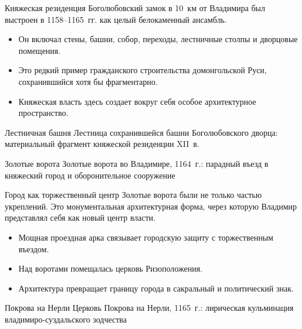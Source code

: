 \begin{frame}{Княжеская резиденция}
  Боголюбовский замок в 10~км от Владимира был выстроен
  в 1158--1165~гг. как целый белокаменный ансамбль.

  \begin{itemize}
    \item Он включал стены, башни, собор, переходы,
          лестничные столпы и дворцовые помещения.
    \item Это редкий пример гражданского строительства
          домонгольской Руси, сохранившийся хотя бы фрагментарно.
    \item Княжеская власть здесь создает вокруг себя
          особое архитектурное пространство.
  \end{itemize}
\end{frame}

\begin{frame}{Лестничная башня}
    {Лестница сохранившейся башни Боголюбовского дворца:
     материальный фрагмент княжеской резиденции XII~в.}
\end{frame}

\begin{frame}{Золотые ворота}
    {Золотые ворота во Владимире, 1164~г.:
     парадный въезд в княжеский город и оборонительное сооружение}
\end{frame}

\begin{frame}{Город как торжественный центр}
  Золотые ворота были не только частью укреплений.
  Это монументальная архитектурная форма, через которую
  Владимир представлял себя как новый центр власти.

  \begin{itemize}
    \item Мощная проездная арка связывает городскую защиту
          с торжественным въездом.
    \item Над воротами помещалась церковь Ризоположения.
    \item Архитектура превращает границу города
          в сакральный и политический знак.
  \end{itemize}
\end{frame}

\begin{frame}{Покрова на Нерли}
    {Церковь Покрова на Нерли, 1165~г.:
     лирическая кульминация владимиро-суздальского зодчества}
\end{frame}

